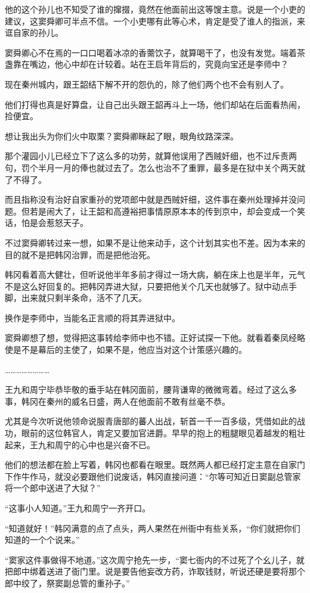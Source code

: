 他的这个孙儿也不知受了谁的撺掇，竟然在他面前出这等馊主意。说是一个小吏的建议，这窦舜卿可半点不信。一个小吏哪有此等心术，肯定是受了谁人的指派，来诓自家的孙儿。

窦舜卿心不在焉的一口口喝着冰凉的香薷饮子，就算喝干了，也没有发觉。端着茶盏靠在嘴边，他心中却在计较着。站在王启年背后的，究竟向宝还是李师中？

现在秦州城内，跟王韶结下解不开的怨仇的，除了他们两个也不会有别人了。

他们打得也真是好算盘，让自己出头跟王韶再斗上一场，他们却站在后面看热闹，捡便宜。

想让我出头为你们火中取栗？窦舜卿眯起了眼，眼角纹路深深。

那个灌园小儿已经立下了这么多的功劳，就算他误用了西贼奸细，也不过斥责两句，罚个半月一月的俸也就过去了。怎么也治不了重罪，最多是在狱中关个两天就了不得了。

而且指称没有治好自家重孙的党项郎中就是西贼奸细，这件事在秦州处理掉并没问题。但若是闹大了，让王韶和高遵裕把事情原原本本的传到京中，却会变成一个笑话，怕是会惹怒天子。

不过窦舜卿转过来一想，如果不是让他来动手，这个计划其实也不差。因为本来的目的就不是把韩冈治罪，而是把他治死。

韩冈看着高大健壮，但听说他半年多前才得过一场大病，躺在床上也是半年，元气不是这么好回复的。把韩冈弄进大狱，只要把他关个几天也就够了。狱中动点手脚，出来就只剩半条命，活不了几天。

换作是李师中，当能名正言顺的将其弄进狱中。

窦舜卿想了想，觉得把这事转给李师中也不错。正好试探一下他。就看着秦凤经略使是不是幕后的主使了，如果不是，他应当对这个计策感兴趣的。

……………………

王九和周宁毕恭毕敬的垂手站在韩冈面前，腰背谦卑的微微弯着。经过了这么多事，韩冈在秦州的威名日盛，两人在他面前不敢有丝毫不恭。

尤其是今次听说他领命说服青唐部的蕃人出战，斩首一千一百多级，凭借如此的战功，眼前的这位韩官人，肯定又要加官进爵。早早的抱上的粗腿眼见着越发的粗壮起来，王九和周宁的心中也是兴奋不已。

他们的想法都在脸上写着，韩冈也都看在眼里。既然两人都已经打定主意在自家门下作牛作马，就没必要跟他们说废话，韩冈直接问道：“尔等可知近日窦副总管家将一个郎中送进了大狱？”

“这事小人知道。”王九和周宁一齐开口。

“知道就好！”韩冈满意的点了点头，两人果然在州衙中有些关系，“你们就把你们知道的一个个说来。”

“窦家这件事做得不地道。”这次周宁抢先一步，“窦七衙内的不过死了个幺儿子，就把郎中绑着送进了衙门里。说是要告他妄改方药，诈取钱财，听说还硬是要将那个郎中绞了，祭窦副总管的重孙子。”

